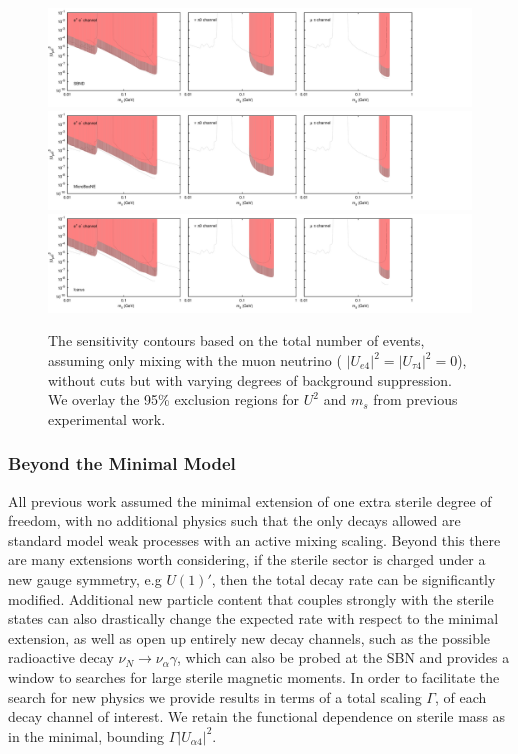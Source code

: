 \documentclass[11pt, a4paper]{article}
\begin{document}
\begin{figure}[t]
\center
\includegraphics[width=1.0\textwidth,clip,trim=0 20 300 15]{figures/sbnd_all_panels_um4.pdf}
\includegraphics[width=1.0\textwidth,clip,trim=0 20 300 15]{figures/muboone_all_panels_um4.pdf}
\includegraphics[width=1.0\textwidth,clip,trim=0 20 300 15]{figures/icarus_all_panels_um4.pdf}

\caption{\label{fig:no_cuts_scaled_bkg_um4_only}The sensitivity contours based on the total
number of events, assuming only mixing with the muon neutrino ( $\vert U_{e 4}\vert^2=\vert U_{\tau 4}\vert^2=0$), without cuts but with varying degrees of background
suppression. We overlay the 95\% exclusion regions for $U^2$ and $m_s$ from
previous experimental work.}

\end{figure}


\subsubsection{Beyond the Minimal Model}

All previous work assumed the minimal extension of one extra sterile degree of
freedom, with no additional physics such that the only decays allowed are
standard model weak processes with an active mixing scaling. Beyond this there
are many extensions worth considering, if the sterile sector is charged under a
new gauge symmetry, e.g $U(1)'$, then the total decay rate can be significantly
modified. Additional new particle content that couples strongly with the sterile
states can also drastically change the expected rate with respect to the minimal
extension, as well as open up entirely new decay channels, such as the possible
radioactive decay $\nu_N \rightarrow \nu_\alpha \gamma$, which can also be probed
at the SBN and provides a window to searches for large sterile magnetic
moments. In order to facilitate the search for new physics we provide results
in terms of a total scaling $\Gamma$, of each decay channel of interest. We
retain the functional dependence on sterile mass as in the minimal, bounding
$\Gamma \vert U_{\alpha 4}\vert^2$. \\
\end{document}

